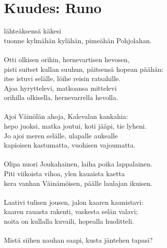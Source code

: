 
\chapter*{Kuudes: Runo}

 lähteäksensä käkesi       \\
tuonne kylmähän kylähän, pimeähän Pohjolahan.               \\
                                                            \\
Otti olkisen orihin, hernevartisen hevosen,                 \\
pisti suitset kullan suuhun, päitsensä hopean päähän:       \\
itse istuvi selälle, löihe reisin ratsahille.               \\
Ajoa hyryttelevi, matkoansa mittelevi                       \\
orihilla olkisella, hernevarrella hevolla.                  \\
                                                            \\
Ajoi Väinölän ahoja, Kalevalan kankahia:                    \\
hepo juoksi, matka joutui, koti jääpi, tie lyheni.          \\
Jo ajoi meren selälle, ulapalle aukealle                    \\
kapioisen kastumatta, vuohisen vajoumatta.                  \\
                                                            \\
Olipa nuori Joukahainen, laiha poika lappalainen.           \\
Piti viikoista vihoa, ylen kauaista kaetta                  \\
kera vanhan Väinämöisen, päälle laulajan ikuisen.           \\
                                                            \\
Laativi tulisen jousen, jalon kaaren kaunistavi:            \\
kaaren rauasta rakenti, vaskesta selän valavi;              \\
noita on kullalla kuvaili, hopealla huolitteli.             \\
                                                            \\
Mistä siihen nauhan saapi, kusta jäntehen tapasi?           \\
